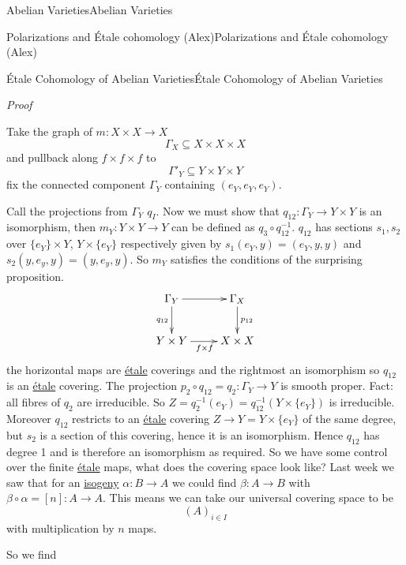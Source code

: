 \documentclass[10pt,]{book}
\makeatletter
\renewcommand*{\proofname}{Proof}
\renewenvironment{proof}[1][\proofname]{\par
  \pushQED{\qed}%
  \normalfont \topsep6\p@\@plus6\p@\relax
  \trivlist
  \item\relax
    {\itshape
    #1\@addpunct{.}}\hspace\labelsep\ignorespaces
}{%
  \popQED\endtrivlist\@endpefalse
}
\numberwithin{equation}{section}
\newcommand{\lb}{[}
\newcommand{\rb}{]}
\makeatother
\begin{document}
\begin{chapterptx}{Abelian Varieties}{}{Abelian Varieties}{}{}
\begin{sectionptx}{Polarizations and Étale cohomology (Alex)}{}{Polarizations and Étale cohomology (Alex)}{}{}
\begin{subsectionptx}{Étale Cohomology of Abelian Varieties}{}{Étale Cohomology of Abelian Varieties}{}{}
\begin{proof}
\hypertarget{p-292}{}%
Take the graph of \(m\colon X\times X \to X\)%
\begin{equation*}
\Gamma_X \subseteq X\times X\times X
\end{equation*}
and pullback along \(f\times f\times f\) to%
\begin{equation*}
\Gamma'_Y \subseteq Y\times Y\times Y
\end{equation*}
fix the connected component \(\Gamma_Y\) containing \((e_Y,e_Y,e_Y)\).%
\par
\hypertarget{p-293}{}%
Call the projections from \(\Gamma_Y\) \(q_I\). Now we must show that \(q_{12}\colon \Gamma_Y \to Y\times Y\) is an isomorphism, then \(m_Y\colon Y\times Y \to Y\) can be defined as \(q_3 \circ q_{12}^{-1}\). \(q_{12}\) has sections \(s_1,s_2\) over \(\{e_Y\}\times Y\), \(Y\times \{e_Y\}\) respectively given by \(s_1(e_Y,y) = (e_Y,y,y)\) and \(s_2(y,e_y,y) = (y,e_y,y)\). So \(m_Y\) satisfies the conditions of the surprising proposition.%
\begin{equation*}
\xymatrix{
\Gamma_Y \ar[r]\ar[d]_{q_{12}} & \Gamma_X\ar[d]^{p_{12}} \\
Y\times Y \ar[r]_{f\times f} & X\times X
}
\end{equation*}
the horizontal maps are \hyperref[def-etale]{étale} coverings and the rightmost an isomorphism so \(q_{12}\) is an \hyperref[def-etale]{étale} covering. The projection \(p_2 \circ q_{12} = q_2 \colon \Gamma_Y\to Y\) is smooth proper. Fact: all fibres of \(q_2\) are irreducible. So \(Z = q_2^{-1} (e_Y) = q_{12}^{-1}(Y\times \{e_Y\})\) is irreducible. Moreover \(q_{12}\) restricts to an \hyperref[def-etale]{étale} covering \(Z \to Y = Y\times\{e_Y\}\) of  the same degree, but \(s_2\) is a section of this covering, hence it is an isomorphism. Hence \(q_{12}\) has degree 1 and is therefore an isomorphism as required.%
\end{proof}
\hypertarget{p-294}{}%
So we have some control over the finite \hyperref[def-etale]{étale} maps, what does the covering space look like? Last week we saw that for an \hyperref[def-supersing-isog-isog]{isogeny} \(\alpha\colon B \to A\) we could find \(\beta \colon A \to B\) with \(\beta\circ\alpha = \lb n\rb\colon A \to A\). This means we can take our universal covering space to be%
\begin{equation*}
(A)_{i\in I}
\end{equation*}
with multiplication by \(n\) maps.%
\par
\hypertarget{p-295}{}%
So we find%
\begin{equation*}

\end{equation*}
\end{subsectionptx}
\end{sectionptx}
\end{chapterptx}
\end{document}
